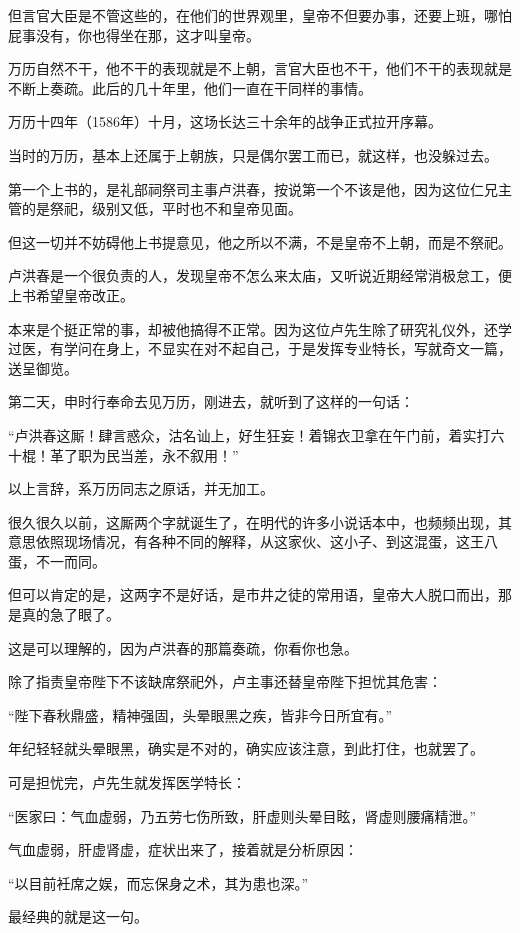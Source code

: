 \begin{multicols}{\theparacolNo}
		但言官大臣是不管这些的，在他们的世界观里，皇帝不但要办事，还要上班，哪怕屁事没有，你也得坐在那，这才叫皇帝。

		万历自然不干，他不干的表现就是不上朝，言官大臣也不干，他们不干的表现就是不断上奏疏。此后的几十年里，他们一直在干同样的事情。

		万历十四年（1586年）十月，这场长达三十余年的战争正式拉开序幕。

		当时的万历，基本上还属于上朝族，只是偶尔罢工而已，就这样，也没躲过去。

		第一个上书的，是礼部祠祭司主事卢洪春，按说第一个不该是他，因为这位仁兄主管的是祭祀，级别又低，平时也不和皇帝见面。

		但这一切并不妨碍他上书提意见，他之所以不满，不是皇帝不上朝，而是不祭祀。

		卢洪春是一个很负责的人，发现皇帝不怎么来太庙，又听说近期经常消极怠工，便上书希望皇帝改正。

		本来是个挺正常的事，却被他搞得不正常。因为这位卢先生除了研究礼仪外，还学过医，有学问在身上，不显实在对不起自己，于是发挥专业特长，写就奇文一篇，送呈御览。

		第二天，申时行奉命去见万历，刚进去，就听到了这样的一句话：

		“卢洪春这厮！肆言惑众，沽名讪上，好生狂妄！着锦衣卫拿在午门前，着实打六十棍！革了职为民当差，永不叙用！”

		以上言辞，系万历同志之原话，并无加工。

		很久很久以前，这厮两个字就诞生了，在明代的许多小说话本中，也频频出现，其意思依照现场情况，有各种不同的解释，从这家伙、这小子、到这混蛋，这王八蛋，不一而同。

		但可以肯定的是，这两字不是好话，是市井之徒的常用语，皇帝大人脱口而出，那是真的急了眼了。

		这是可以理解的，因为卢洪春的那篇奏疏，你看你也急。

		除了指责皇帝陛下不该缺席祭祀外，卢主事还替皇帝陛下担忧其危害：

		“陛下春秋鼎盛，精神强固，头晕眼黑之疾，皆非今日所宜有。”

		年纪轻轻就头晕眼黑，确实是不对的，确实应该注意，到此打住，也就罢了。

		可是担忧完，卢先生就发挥医学特长：

		“医家曰：气血虚弱，乃五劳七伤所致，肝虚则头晕目眩，肾虚则腰痛精泄。”

		气血虚弱，肝虚肾虚，症状出来了，接着就是分析原因：

		“以目前衽席之娱，而忘保身之术，其为患也深。”

		最经典的就是这一句。


\end{multicols}
